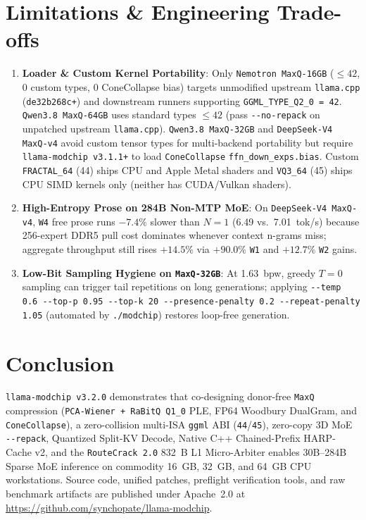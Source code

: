 \documentclass[10pt,twocolumn]{article}
\begin{document}
\section{Limitations \& Engineering Trade-offs}
\begin{enumerate}
    \item \textbf{Loader \& Custom Kernel Portability}: Only \texttt{Nemotron MaxQ-16GB} ($\le 42$, 0 custom types, 0 ConeCollapse bias) targets unmodified upstream \texttt{llama.cpp} (\texttt{de32b268c+}) and downstream runners supporting \texttt{GGML\_TYPE\_Q2\_0 = 42}. \texttt{Qwen3.8 MaxQ-64GB} uses standard types $\le 42$ (pass \texttt{{-}{-}no-repack} on unpatched upstream \texttt{llama.cpp}). \texttt{Qwen3.8 MaxQ-32GB} and \texttt{DeepSeek-V4 MaxQ-v4} avoid custom tensor types for multi-backend portability but require \texttt{llama-modchip v3.1.1+} to load \texttt{ConeCollapse} \texttt{ffn\_down\_exps.bias}. Custom \texttt{FRACTAL\_64} (44) ships CPU and Apple Metal shaders and \texttt{VQ3\_64} (45) ships CPU SIMD kernels only (neither has CUDA/Vulkan shaders).
    \item \textbf{High-Entropy Prose on 284B Non-MTP MoE}: On \texttt{DeepSeek-V4 MaxQ-v4}, \texttt{W4} free prose runs $-7.4\%$ slower than $N=1$ (6.49 vs.\ 7.01~tok/s) because 256-expert DDR5 pull cost dominates whenever context n-grams miss; aggregate throughput still rises $+14.5\%$ via $+90.0\%$ \texttt{W1} and $+12.7\%$ \texttt{W2} gains.
    \item \textbf{Low-Bit Sampling Hygiene on \texttt{MaxQ-32GB}}: At 1.63~bpw, greedy $T=0$ sampling can trigger tail repetitions on long generations; applying \texttt{{-}{-}temp 0.6 {-}{-}top-p 0.95 {-}{-}top-k 20 {-}{-}presence-penalty 0.2 {-}{-}repeat-penalty 1.05} (automated by \texttt{./modchip}) restores loop-free generation.
\end{enumerate}

\section{Conclusion}
\texttt{llama-modchip v3.2.0} demonstrates that co-designing donor-free \texttt{MaxQ} compression (\texttt{PCA-Wiener + RaBitQ Q1\_0} PLE, FP64 Woodbury DualGram, and \texttt{ConeCollapse}), a zero-collision multi-ISA \texttt{ggml} ABI (\texttt{44}/\texttt{45}), zero-copy 3D MoE \texttt{{-}{-}repack}, Quantized Split-KV Decode, Native C++ Chained-Prefix HARP-Cache v2, and the \texttt{RouteCrack 2.0} 832~B L1 Micro-Arbiter enables 30B--284B Sparse MoE inference on commodity 16~GB, 32~GB, and 64~GB CPU workstations. Source code, unified patches, preflight verification tools, and raw benchmark artifacts are published under Apache~2.0 at \url{https://github.com/synchopate/llama-modchip}.
\end{document}
